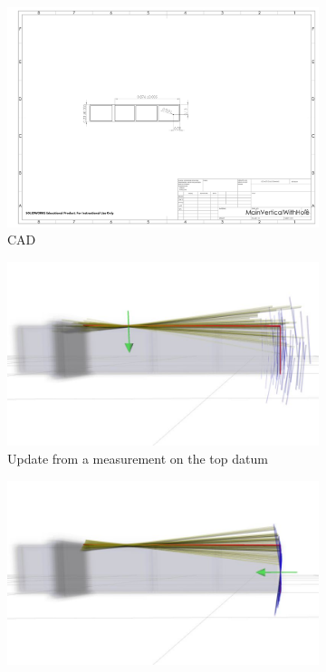 \documentclass[letterpaper, 10 pt, conference]{ieeeconf}
\begin{document}
\begin{figure}
  \centering
  \begin{subfigure}[b]{.9\linewidth}
    \includegraphics[width=\linewidth, clip, trim=4in 5in 6.5in 4.5in]{MainVerticalWithHole}
    \caption{CAD}
    \label{fig:Overview:CAD}
  \end{subfigure}
  \hfill
  \begin{subfigure}[b]{.9\linewidth}
    \includegraphics[width=\linewidth, clip, trim=0.1in 1.5in 0.3in 1.3in]{final_result_4_2}
    \caption{Update from a measurement on the top datum}
    \label{fig:Overview:belief_top}
  \end{subfigure}
  \hfill
  \begin{subfigure}[b]{.9\linewidth}
    \includegraphics[width=\linewidth, clip, trim=0.04in 1.5in 0.35in 1.3in]{final_result_4_3}

\end{subfigure}
\end{figure}
\end{document}
